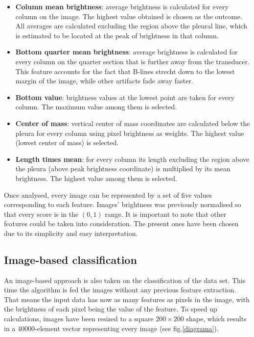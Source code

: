 \documentclass[12pt]{article} %
\begin{document}
\begin{itemize}
	\item \textbf{Column mean brightness}: average brightness is calculated for every column on the image. The highest value obtained is chosen as the outcome. All averages are calculated excluding the region above the pleural line, which is estimated to be located at the peak of brightness in that column.
	
	\item \textbf{Bottom quarter mean brightness}: average brightness is calculated for every column on the quarter section that is further away from the transducer. This feature accounts for the fact that B-lines strecht down to the lowest margin of the image, while other artifacts fade away faster.
	
	\item \textbf{Bottom value}: brightness values at the lowest point are taken for every column. The maximum value among them is selected.
	
	\item \textbf{Center of mass}: vertical center of mass coordinates are calculated below the pleura for every column using pixel brightness as weights. The highest value (lowest center of mass) is selected. 
	
	\item\textbf{Length times mean}: for every column its length excluding the region above the pleura (above peak brightness coordinate) is multiplied by its mean brightness. The highest value among them is selected.
	
\end{itemize}

Once analysed, every image can be represented by a set of five values corresponding to each feature. Images' brightness was previously normalised so that every score is in the $(0,1)$ range. It is important to note that other features could be taken into consideration. The present ones have been chosen due to its simplicity and easy interpretation.



\subsection{Image-based classification}
An image-based approach is also taken on the classification of the data set. This time the algorithm is fed the images without any previous feature extraction. That means the input data has now as many features as pixels in the image, with the brightness of each pixel being the value of the feature. To speed up calculations, images have been resized to a square $200 \times 200$ shape, which results in a $40000$-element vector representing every image (see fig.\ref{diagrama}).
\end{document}
